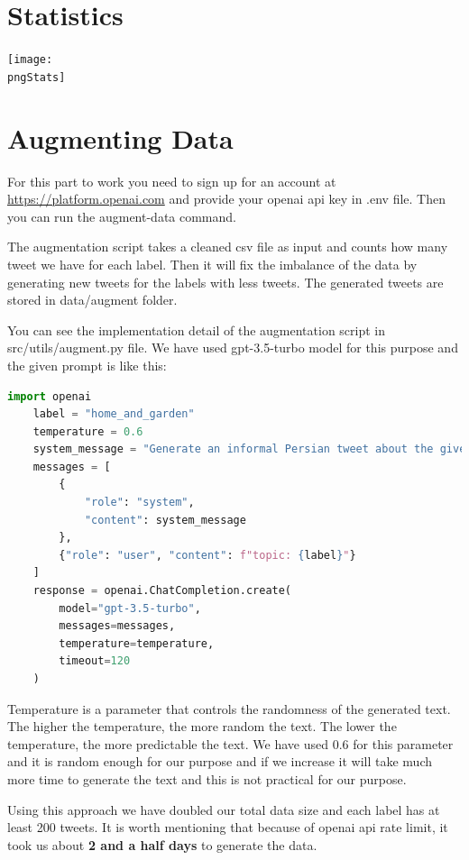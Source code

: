 \documentclass[12pt, letterpaper]{article}
\def\timestamp{2023-06-02-10-27-57}
\def\rootDir{../..}
\def\csvStats{\rootDir/stats/stats_\timestamp.csv}
\def\pngStats{\rootDir/stats/plot_\timestamp.png}
\begin{document}
    \section{Statistics}\label{sec:statistics}
    \csvautotabular{\csvStats}
    \begin{center}
        \texttt{[image: \\pngStats]}
    \end{center}


    \section{Augmenting Data}\label{sec:augmenting-data}
    For this part to work you need to sign up for an account at \url{https://platform.openai.com} and provide your openai api key in .env file. Then you can run the augment-data command.

    The augmentation script takes a cleaned csv file as input and counts how many tweet we have for each label. Then it will fix the imbalance of the data by generating new tweets for the labels with less tweets. The generated tweets are stored in data\slash augment folder.

    You can see the implementation detail of the augmentation script in src\slash utils\slash augment.py file. We have used gpt-3.5-turbo model for this purpose and the given prompt is like this:
    \begin{lstlisting}[language=Python]
    import openai
    label = "home_and_garden"
    temperature = 0.6
    system_message = "Generate an informal Persian tweet about the given topic without any hashtags, mentions, links, or emojis."  # noqa
    messages = [
        {
            "role": "system",
            "content": system_message
        },
        {"role": "user", "content": f"topic: {label}"}
    ]
    response = openai.ChatCompletion.create(
        model="gpt-3.5-turbo",
        messages=messages,
        temperature=temperature,
        timeout=120
    )
    \end{lstlisting}
    Temperature is a parameter that controls the randomness of the generated text. The higher the temperature, the more random the text. The lower the temperature, the more predictable the text. We have used 0.6 for this parameter and it is random enough for our purpose and if we increase it will take much more time to generate the text and this is not practical for our purpose.

    Using this approach we have doubled our total data size and each label has at least 200 tweets. It is worth mentioning that because of openai api rate limit, it took us about \textbf{2 and a half days} to generate the data.
\end{document}

